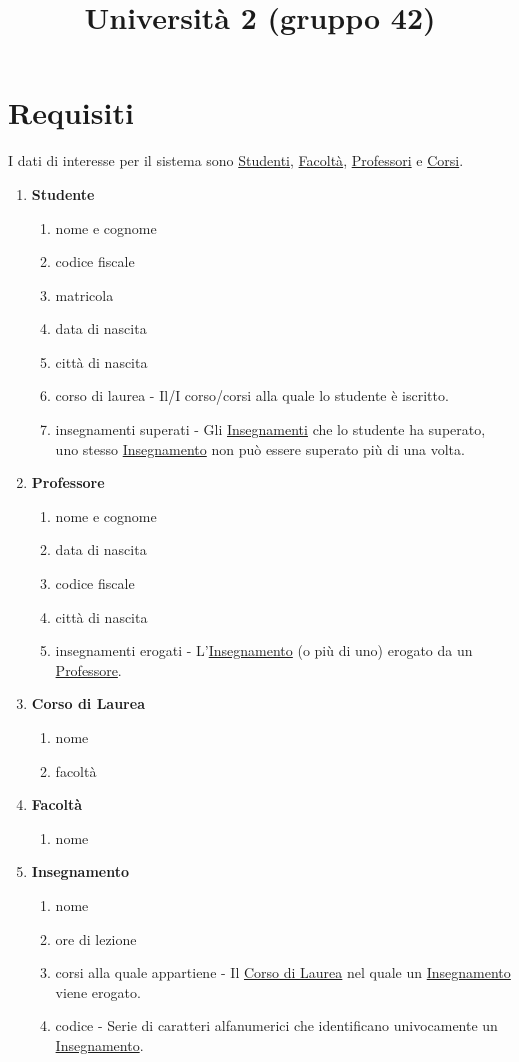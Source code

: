 \documentclass[12pt, letterpaper]{article}
\title{Università 2 (gruppo 42)}
\date{}
\begin{document}
\maketitle


\section{Requisiti}
I dati di interesse per il sistema sono \underline{Studenti}, \underline{Facoltà}, \underline{Professori} e \underline{Corsi}.
\begin{enumerate}
    \item \textbf{Studente}\begin{enumerate}
        \item nome e cognome
        \item codice fiscale 
        \item matricola 
        \item data di nascita 
        \item città di nascita 
        \item corso di laurea - Il/I corso/corsi alla quale lo studente è iscritto.
        \item insegnamenti superati - Gli \underline{Insegnamenti} che lo studente ha superato, uno stesso \underline{Insegnamento} non può essere 
        superato più di una volta.
    \end{enumerate}
    \item \textbf{Professore}\begin{enumerate}
        \item nome e cognome
        \item data di nascita 
        \item codice fiscale 
        \item città di nascita 
        \item insegnamenti erogati - L'\underline{Insegnamento} (o più di uno) erogato da un \underline{Professore}.
    \end{enumerate}
    \item \textbf{Corso di Laurea}\begin{enumerate}
        \item nome 
        \item facoltà
    \end{enumerate}
    \item \textbf{Facoltà}\begin{enumerate}
        \item nome
    \end{enumerate}
    \item \textbf{Insegnamento}\begin{enumerate}
        \item nome 
        \item ore di lezione 
        \item corsi alla quale appartiene - Il \underline{Corso di Laurea} nel quale un \underline{Insegnamento} viene erogato.
        \item codice -  Serie di caratteri alfanumerici che identificano univocamente un \underline{Insegnamento}.
    \end{enumerate}
\end{enumerate}
\newpage
\end{document}
